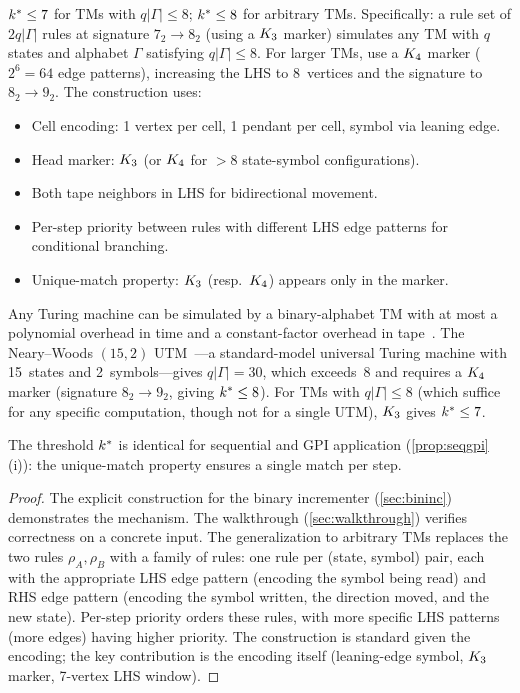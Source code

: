 \documentclass{../shared/primo}
\begin{document}
\begin{theorem}[Universality]\label{thm:universality-body}
$k^* \leq 7$ for TMs with $q|\Gamma| \leq 8$; $k^* \leq 8$ for arbitrary TMs. Specifically: a rule set of $2q|\Gamma|$ rules at signature $7_2 \to 8_2$ (using a $K_{3}$ marker) simulates any TM with $q$ states and alphabet $\Gamma$ satisfying $q|\Gamma| \leq 8$. For larger TMs, use a $K_{4}$ marker ($2^6 = 64$ edge patterns), increasing the LHS to 8~vertices and the signature to $8_2 \to 9_2$. The construction uses:
\begin{itemize}
\item Cell encoding: 1 vertex per cell, 1 pendant per cell, symbol via leaning edge.
\item Head marker: $K_{3}$ (or $K_{4}$ for $> 8$ state-symbol configurations).
\item Both tape neighbors in LHS for bidirectional movement.
\item Per-step priority between rules with different LHS edge patterns for conditional branching.
\item Unique-match property: $K_{3}$ (resp.\ $K_{4}$) appears only in the marker.
\end{itemize}

Any Turing machine can be simulated by a binary-alphabet TM with at most a polynomial overhead in time and a constant-factor overhead in tape~\cite{arora2009computational}. The Neary--Woods $(15,2)$ UTM~\cite{neary2009four}---a standard-model universal Turing machine with 15~states and 2~symbols---gives $q|\Gamma| = 30$, which exceeds~8 and requires a $K_{4}$ marker (signature $8_2 \to 9_2$, giving $k^* \leq 8$). For TMs with $q|\Gamma| \leq 8$ (which suffice for any specific computation, though not for a single UTM), $K_{3}$ gives $k^* \leq 7$.

The threshold $k^*$ is identical for sequential and GPI application (\cref{prop:seqgpi}(i)): the unique-match property ensures a single match per step.
\end{theorem}

\begin{proof}
The explicit construction for the binary incrementer (\cref{sec:bininc}) demonstrates the mechanism. The walkthrough (\cref{sec:walkthrough}) verifies correctness on a concrete input. The generalization to arbitrary TMs replaces the two rules $\rho_A, \rho_B$ with a family of rules: one rule per (state, symbol) pair, each with the appropriate LHS edge pattern (encoding the symbol being read) and RHS edge pattern (encoding the symbol written, the direction moved, and the new state). Per-step priority orders these rules, with more specific LHS patterns (more edges) having higher priority. The construction is standard given the encoding; the key contribution is the encoding itself (leaning-edge symbol, $K_{3}$ marker, 7-vertex LHS window).
\end{proof}
\end{document}
